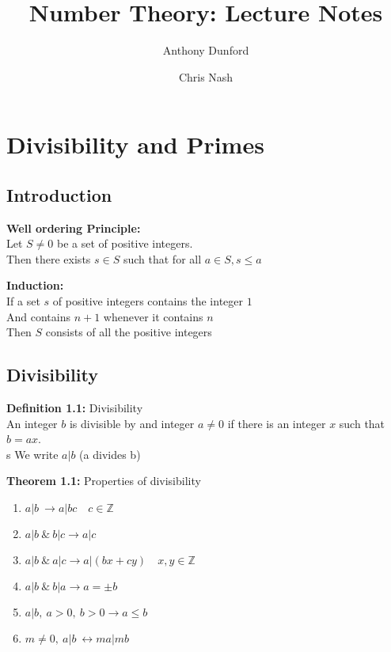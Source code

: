 \documentclass[a4paper]{article}
\title{Number Theory: Lecture Notes}
\author{Anthony Dunford \and Chris Nash}
\begin{document}
\maketitle


\section{Divisibility and Primes}

\subsection{Introduction}

\textbf{Well ordering Principle:}\\
Let $S\neq0$ be a set of positive integers.\\
Then there exists $s\in S$ such that for all $a\in S, s\leq a$

\textbf{Induction:}\\
If a set $s$ of positive integers contains the integer $1$\\
And contains $n+1$ whenever it contains $n$\\
Then $S$ consists of all the positive integers

\subsection{Divisibility}

\textbf{Definition 1.1:} Divisibility\\
An integer $b$ is divisible by and integer $a\neq0$ if there is an integer
$x$ such that $b=ax$.\\s
We write $a|b$ (a divides b)

\textbf{Theorem 1.1:} Properties of divisibility
\begin{enumerate}
    \item $a|b\            \rightarrow a|bc\quad c\in \mathbb{Z}$
    \item $a|b\ \&\ b|c    \rightarrow a|c$
    \item $a|b\ \&\ a|c    \rightarrow a|(bx+cy)\quad x,y\in\mathbb{Z}$
    \item $a|b\ \&\ b|a    \rightarrow a=\pm b$


    \item $a|b,\ a>0,\ b>0 \rightarrow a\leq b$
    \item $m\neq0,\ a|b\   \leftrightarrow ma|mb$
\end{enumerate}
\end{document}
